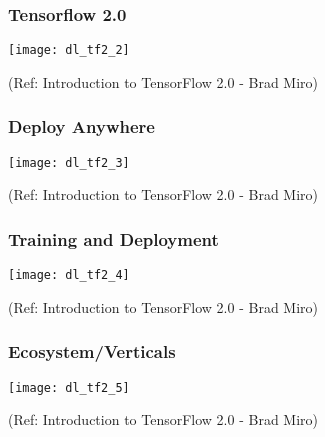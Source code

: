 \begin{frame}[fragile] \frametitle{Tensorflow 2.0}

\begin{center}
\texttt{[image: dl\_tf2\_2]}
\end{center}


\tiny{(Ref: Introduction to TensorFlow 2.0 - Brad Miro)}
\end{frame}

\begin{frame}[fragile] \frametitle{Deploy Anywhere}

\begin{center}
\texttt{[image: dl\_tf2\_3]}
\end{center}


\tiny{(Ref: Introduction to TensorFlow 2.0 - Brad Miro)}
\end{frame}

\begin{frame}[fragile] \frametitle{Training and Deployment}

\begin{center}
\texttt{[image: dl\_tf2\_4]}
\end{center}


\tiny{(Ref: Introduction to TensorFlow 2.0 - Brad Miro)}
\end{frame}

\begin{frame}[fragile] \frametitle{Ecosystem/Verticals}

\begin{center}
\texttt{[image: dl\_tf2\_5]}
\end{center}


\tiny{(Ref: Introduction to TensorFlow 2.0 - Brad Miro)}
\end{frame}



